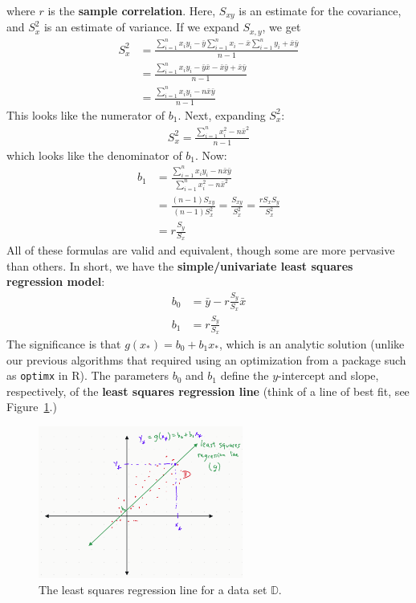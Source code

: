 \documentclass[12pt, a4paper]{article}
\theoremstyle{definition}
\begin{document}
	where $r$ is the \textbf{sample correlation}. Here, $S_{xy}$ is an estimate for the covariance,
	and $S_x^2$ is an estimate of variance. If we expand $S_{x,y}$, we get
	\begin{align*}
		S_x^2 &= \frac{\sum_{i=1}^{n}x_iy_i-\bar{y}\sum_{i=1}^{n}x_i-\bar{x}\sum_{i=1}^{n}y_i+\bar{x}\bar{y}}{n-1}\\
		&=\frac{\sum_{i=1}^{n}x_iy_i-\bar{y}\bar{x}-\bar{x}\bar{y}+\bar{x}\bar{y}}{n-1}\\
		&=\frac{\sum_{i=1}^{n}x_iy_i-n\bar{x}\bar{y}}{n-1}
	\end{align*}
	This looks like the numerator of $b_1$. Next, expanding $S_x^2$:
	\begin{align*}
		S_x^2 = \frac{\sum_{i=1}^{n}x_i^2 - n\bar{x}^2}{n-1}
	\end{align*}
	which looks like the denominator of $b_1$. Now:
	\begin{align*}
		b_1 &= \frac{\sum_{i=1}^{n}x_iy_i-n\bar{x}\bar{y}}{\sum_{i=1}^{n}x_i^2-n\bar{x}^2}\\
		&=\frac{(n-1)S_{xy}}{(n-1)S_x^2}
		=\frac{S_{xy}}{S_{x}^2}
		=\frac{rS_xS_y}{S_x^2}\\
		&=r\frac{S_y}{S_x}
	\end{align*}
	All of these formulas are valid and equivalent, though some are more pervasive than others. In short,
	we have the \textbf{simple/univariate least squares regression model}:
	\begin{align}
		b_0 &= \bar{y}-r\frac{S_y}{S_x}\bar{x}\\
		b_1 &= r\frac{S_y}{S_x}
	\end{align}
	The significance is that $g(x_*) = b_0 + b_1x_*$, which is an analytic solution
	(unlike our previous algorithms that required using an optimization from
	a package such as \texttt{optimx} in R). The parameters $b_0$ and $b_1$ define
	the $y$-intercept and slope, respectively, of the \textbf{least squares regression line}
	(think of a line of best fit, see Figure~\ref{fig:line-best-fit}.)
	\begin{figure}
		\centering
		\includegraphics[width=0.6\textwidth]{least-squares-regression-line}
		\caption{The least squares regression line for a data set $\mathbb{D}$.}
		\label{fig:line-best-fit}
	\end{figure}
\end{document}
